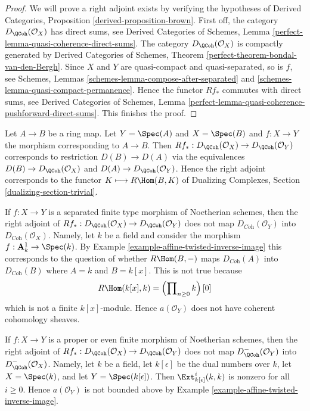 \begin{proof}
We will prove a right adjoint exists by verifying the hypotheses of
Derived Categories, Proposition \ref{derived-proposition-brown}.
First off, the category $D_\QCoh(\mathcal{O}_X)$ has direct sums, see
Derived Categories of Schemes, Lemma
\ref{perfect-lemma-quasi-coherence-direct-sums}.
The category $D_\QCoh(\mathcal{O}_X)$ is compactly generated by
Derived Categories of Schemes, Theorem
\ref{perfect-theorem-bondal-van-den-Bergh}.
Since $X$ and $Y$ are quasi-compact and quasi-separated, so is $f$, see
Schemes, Lemmas \ref{schemes-lemma-compose-after-separated} and
\ref{schemes-lemma-quasi-compact-permanence}.
Hence the functor $Rf_*$ commutes with direct sums, see
Derived Categories of Schemes, Lemma
\ref{perfect-lemma-quasi-coherence-pushforward-direct-sums}.
This finishes the proof.
\end{proof}

\begin{example}
\label{example-affine-twisted-inverse-image}
Let $A \to B$ be a ring map. Let $Y = \Spec(A)$ and $X = \Spec(B)$
and $f : X \to Y$ the morphism corresponding to $A \to B$.
Then $Rf_* : D_\QCoh(\mathcal{O}_X) \to D_\QCoh(\mathcal{O}_Y)$
corresponds to restriction $D(B) \to D(A)$ via
the equivalences $D(B) \to D_\QCoh(\mathcal{O}_X)$ and
$D(A) \to D_\QCoh(\mathcal{O}_Y)$. Hence the right adjoint
corresponds to the functor $K \longmapsto R\Hom(B, K)$ of
Dualizing Complexes, Section \ref{dualizing-section-trivial}.
\end{example}

\begin{example}
\label{example-does-not-preserve-coherent}
If $f : X \to Y$ is a separated finite type morphism of Noetherian schemes,
then the right adjoint of
$Rf_* : D_\QCoh(\mathcal{O}_X) \to D_\QCoh(\mathcal{O}_Y)$ does not map
$D_{\textit{Coh}}(\mathcal{O}_Y)$ into
$D_{\textit{Coh}}(\mathcal{O}_X)$. Namely, let $k$ be a field and
consider the morphism $f : \mathbf{A}^1_k \to \Spec(k)$. By
Example \ref{example-affine-twisted-inverse-image}
this corresponds to the question of whether
$R\Hom(B, -)$ maps $D_{\textit{Coh}}(A)$ into $D_{\textit{Coh}}(B)$
where $A = k$ and $B = k[x]$. This is not true because
$$
R\Hom(k[x], k) = \left(\prod\nolimits_{n \geq 0} k\right)[0]
$$
which is not a finite $k[x]$-module. Hence $a(\mathcal{O}_Y)$
does not have coherent cohomology sheaves.
\end{example}

\begin{example}
\label{example-does-not-preserve-bounded-above}
If $f : X \to Y$ is a proper or even finite morphism of Noetherian schemes,
then the right adjoint of
$Rf_* : D_\QCoh(\mathcal{O}_X) \to D_\QCoh(\mathcal{O}_Y)$
does not map $D_\QCoh^-(\mathcal{O}_Y)$ into
$D_\QCoh^-(\mathcal{O}_X)$. Namely, let $k$ be a field, let
$k[\epsilon]$ be the dual numbers over $k$, let
$X = \Spec(k)$, and let $Y = \Spec(k[\epsilon])$.
Then $\Ext^i_{k[\epsilon]}(k, k)$ is nonzero for all $i \geq 0$.
Hence $a(\mathcal{O}_Y)$ is not bounded above
by Example \ref{example-affine-twisted-inverse-image}.
\end{example}

